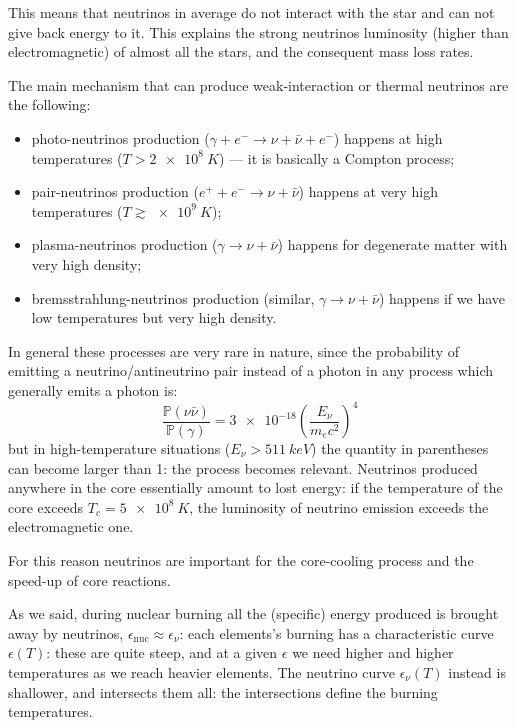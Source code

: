 \documentclass[main.tex]{subfiles}
\begin{document}
This means that neutrinos in average do not interact with the star and can not give back energy to it. This explains the strong neutrinos luminosity (higher than electromagnetic) of almost all the stars, and the consequent mass loss rates.

The main mechanism that can produce weak-interaction or thermal neutrinos are the following:
%
\begin{itemize}
    \item photo-neutrinos production ($\gamma+e^- \to \nu + \bar\nu +e^-$) happens at high temperatures (\(T > \SI{2e8}{K}\)) --- it is basically a Compton process;
    \item pair-neutrinos production ($e^++e^- \to \nu + \bar\nu $) happens at very high temperatures (\(T \gtrsim \SI{e9}{K}\));
    \item plasma-neutrinos production ($\gamma \to \nu + \bar\nu $) happens for degenerate matter with very high density;
    \item bremsstrahlung-neutrinos production (similar, $\gamma \to \nu + \bar\nu $) happens if we have low temperatures but very high density. 
\end{itemize}

In general these processes are very rare in nature, since the probability of emitting a neutrino/antineutrino pair instead of a photon in any process which generally emits a photon is:
%
\begin{equation}
    \frac{\mathbb{P}(\nu\bar\nu)}{\mathbb{P}(\gamma)}=\num{3e-18}\left(\frac{E_\nu}{m_e c^2}\right)^4
\end{equation}
%
but in high-temperature situations (\(E_\nu > \SI{511}{keV}\)) the quantity in parentheses can become larger than 1: the process becomes relevant.
Neutrinos produced anywhere in the core essentially amount to lost energy: if the temperature of the core exceeds \(T_c = \SI{5e8}{K}\), the luminosity of neutrino emission exceeds the electromagnetic one.

For this reason neutrinos are important for the core-cooling process and the speed-up of core reactions.

As we said, during nuclear burning all the (specific) energy produced is brought away by neutrinos, \(\epsilon _{\text{nuc}}\approx \epsilon_{\nu }\): each elements's burning has a characteristic curve \(\epsilon (T)\): these are quite steep, and at a given \(\epsilon \) we need higher and higher temperatures as we reach heavier elements. 
The neutrino curve \(\epsilon_{\nu } (T)\) instead is shallower, and intersects them all: the intersections define the burning temperatures. 
\end{document}
